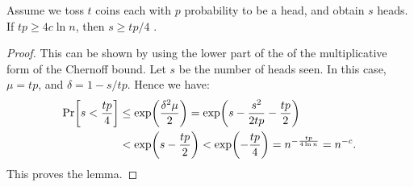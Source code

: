 \begin{lemma}\label{lem:coin-toss}
  Assume we toss $t$ coins each with $p$ probability to be a head, and obtain $s$ heads. 
  If $tp\ge 4c\ln n$, then $s\ge tp/4$ \whp{}.  
\end{lemma}
\begin{proof}
  This can be shown by using the lower part of the of the multiplicative form of the Chernoff bound.
  Let $s$ be the number of heads seen.
  In this case, $\mu=tp$, and $\delta=1-s/tp$.
  Hence we have:
  \begin{align*}
        \Pr\left[s<{tp\over 4}\right] &\le\exp\left(\delta^2\mu\over 2\right)=\exp\left(s-{s^2\over 2tp}-{tp\over2}\right)\\
        &<\exp\left(s-{tp\over 2}\right)<\exp\left(-{tp\over 4}\right)=n^{-{tp\over4\ln{n}}}=n^{-c}.
  \end{align*} 
  This proves the lemma.
\end{proof}

